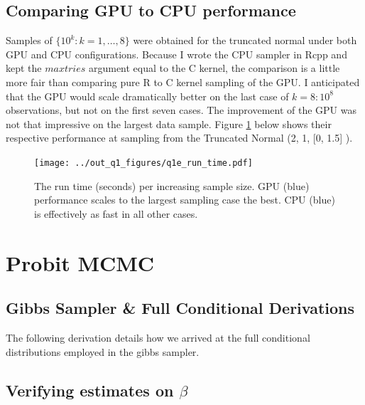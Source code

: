\documentclass[11pt]{amsart}
\begin{document}
\newpage

\subsection{Comparing GPU to CPU performance}

Samples of $\{10^k: k = 1, \dots, 8\}$ were obtained for the truncated normal under both GPU and CPU configurations. Because I wrote the CPU sampler in Rcpp and kept the $maxtries$ argument equal to the C kernel, the comparison is a little more fair than comparing pure R  to C kernel sampling of the GPU. I anticipated that the GPU would scale dramatically better on the last case of $k = 8: 10^8$ observations, but not on the first seven cases.  The improvement of the GPU was not that impressive on the largest data sample.  Figure \ref{fig:scaling} below shows their respective performance at sampling from the Truncated Normal \Big (2, 1, [0, 1.5] \Big ). 

\begin{figure}[htbp] %
   \centering
   \texttt{[image: ../out\_q1\_figures/q1e\_run\_time.pdf]} 
   \caption{The run time (seconds) per increasing sample size. GPU (blue) performance scales to the largest sampling case the best. CPU (blue) is effectively as fast in all other cases.}
   \label{fig:scaling}
\end{figure}

\section{Probit MCMC}

\subsection{Gibbs Sampler \& Full Conditional Derivations}

The following derivation details how we arrived at the full conditional distributions employed in the gibbs sampler. 



\subsection{Verifying estimates on $\beta$}
\end{document}
